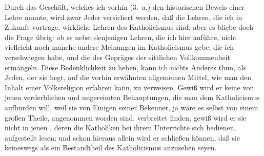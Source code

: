\begin{aufza}
\item Durch das Geschäft, welches ich vorhin (3.~a.) den historischen Beweis einer Lehre nannte, wird zwar Jeder versichert werden, daß die Lehren, die ich in Zukunft vortrage, wirkliche Lehren des Katholicismus sind; aber es bliebe doch die Frage übrig: ob es nebst denjenigen Lehren, die ich hier anführe, nicht vielleicht noch manche andere Meinungen im Katholicismus gebe, die ich verschwiegen habe, und die des Gepräges der sittlichen Vollkommenheit ermangeln. Diese Bedenklichkeit zu heben, kann ich nichts Anderes thun, als Jeden, der sie hegt, auf die vorhin erwähnten allgemeinen Mittel, wie man den Inhalt einer Volksreligion erfahren kann, zu verweisen. Gewiß wird er keine von jenen verderblichen und ungereimten Behauptungen, die man dem Katholicismus aufbürden will, weil sie von Einigen seiner Bekenner, ja wäre es selbst von einem großen Theile, angenommen worden sind,  verbreitet finden; gewiß wird er sie nicht in jenen , deren die Katholiken bei ihrem Unterrichte sich bedienen, aufgestellt lesen; und schon hieraus allein wird er schließen können, daß sie keineswegs als ein Bestandtheil des Katholicismus anzusehen seyen.
\end{aufza}


